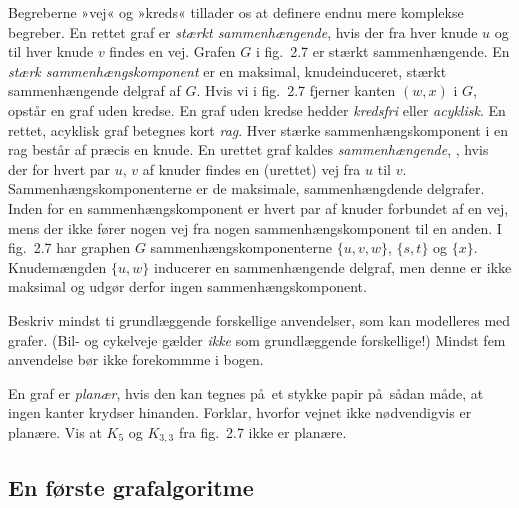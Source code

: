 Begreberne »vej« og »kreds« tillader os at definere endnu mere komplekse begreber.
En rettet graf er 
\emph{stærkt sammenhængende},
hvis der fra hver knude $u$ og til hver knude $v$ findes en vej.
Grafen $G$ i fig.~2.7 er stærkt sammenhængende.
En \emph{stærk sammenhængskomponent} 
er en maksimal, knudeinduceret, stærkt sammenhængende delgraf af $G$.
Hvis vi i fig.~2.7 fjerner kanten $(w,x)$ i $G$, opstår en graf uden kredse.
En graf uden kredse hedder \emph{kredsfri} eller \emph{acyklisk}.
En rettet, acyklisk graf betegnes kort \emph{rag}.
Hver stærke sammenhængskomponent i en rag består af præcis en knude.
En urettet graf kaldes 
\emph{sammenhængende},
,
hvis der for hvert par $u$, $v$ af knuder findes en (urettet) vej fra $u$ til $v$.
Sammenhængskomponenterne er de maksimale, sammenhængdende delgrafer.
Inden for en sammenhængskomponent er hvert par af knuder forbundet af en vej, mens der ikke fører nogen vej fra nogen sammenhængskomponent til en anden.
I fig.~2.7 har graphen $G$ sammenhængskomponenterne $\{u,v,w\}$, $\{s,t\}$ og $\{x\}$.
Knudemængden $\{u,w\}$ inducerer en sammenhængende delgraf, men denne er ikke maksimal og udgør derfor ingen sammenhængskomponent.

\begin{exerc}
Beskriv mindst ti grundlæggende forskellige anvendelser, som kan modelleres med grafer.
(Bil- og cykelveje gælder \emph{ikke} som grundlæggende forskellige!)
Mindst fem anvendelse bør ikke forekommme i bogen.
\end{exerc}

\begin{exerc}
En graf er \emph{planær},
  hvis den kan tegnes på et stykke papir på sådan måde, at ingen kanter krydser hinanden.
Forklar, hvorfor vejnet ikke nødvendigvis er planære.
Vis at $K_5$ og $K_{3,3}$ fra fig.~2.7 ikke er planære.
\end{exerc}

\subsection{En første grafalgoritme}


